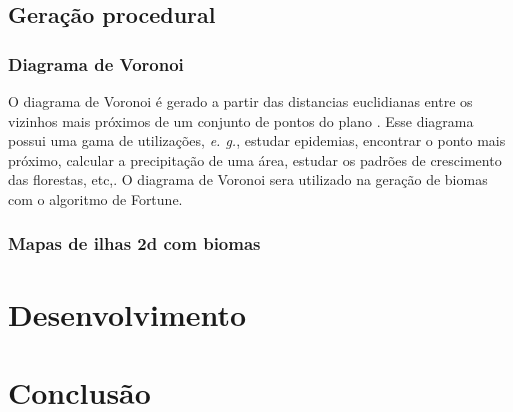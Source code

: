 \documentclass[
	12pt,				%
	openright,			%
	twoside,			%
	a4paper,			%
	english,			%
	french,				%
	spanish,			%
	brazil				%
	]{abntex2}
\begin{document}
\section{Geração procedural}
\subsection{Diagrama de Voronoi}

O diagrama de Voronoi é gerado a partir das distancias euclidianas entre os vizinhos mais próximos de um conjunto de pontos do plano\space
\cite{diagrama_de_voronoi:_uma_exploracao_nas_distancias_euclidiana_e_do_taxi}. Esse diagrama possui uma gama de utilizações, \emph{e. g.}, estudar epidemias, encontrar o 
ponto mais próximo, calcular a precipitação de uma área, estudar os padrões de crescimento das florestas, etc,\space\cite{poligonos_de_thiessen_ou_voronoi}. O diagrama de 
Voronoi sera utilizado na geração de biomas com o algoritmo de Fortune.


\subsection{Mapas de ilhas 2d com biomas}

\chapter{Desenvolvimento}


\chapter*[Conclusão]{Conclusão}

\lipsum[31-33]

\postextual


\end{document}
